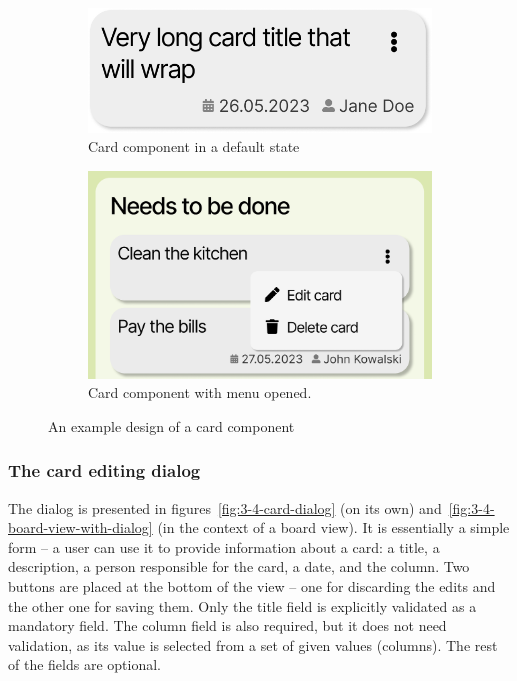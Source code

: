 \begin{figure}
    \centering
    \begin{subfigure}[m]{0.45\textwidth}
        \centering
        \includegraphics[width=\textwidth]{./3-research-methodology/card-component}
        \caption{Card component in a default state}
        \label{fig:3-4-card-component-plain}
    \end{subfigure}
    \hfill
    \begin{subfigure}[m]{0.45\textwidth}
        \centering
        \includegraphics[width=\textwidth]{./3-research-methodology/card-component-with-menu}
        \caption{Card component with menu opened.}
        \label{fig:3-4-card-component-with-menu}
    \end{subfigure}
    \caption{An example design of a card component}
    \label{fig:3-4-card-component}
\end{figure}

\subsubsection{The card editing dialog}
The dialog is presented in figures~\ref{fig:3-4-card-dialog} (on its own) and~\ref{fig:3-4-board-view-with-dialog} (in the context of a board view).
It is essentially a simple form -- a user can use it to provide information about a card: a title, a description, a person responsible for the card, a date, and the column.
Two buttons are placed at the bottom of the view -- one for discarding the edits and the other one for saving them.
Only the title field is explicitly validated as a mandatory field.
The column field is also required, but it does not need validation, as its value is selected from a set of given values (columns).
The rest of the fields are optional.

